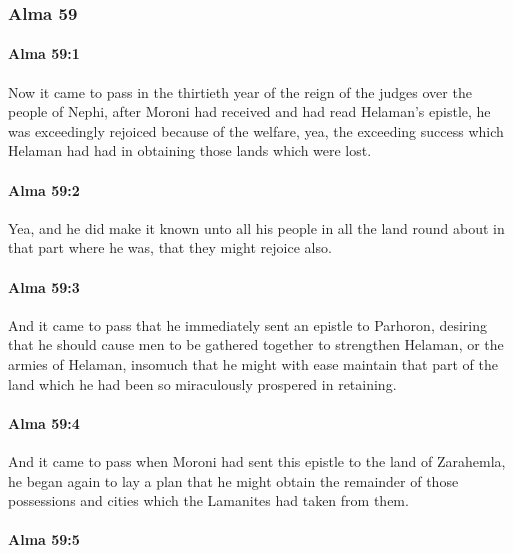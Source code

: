 	\subsubsection{Alma 59} %
		\label{ALMA-59}
		
		\paragraph{Alma 59:1} %
			\label{ALMA-59-1}

			Now it came to pass in the thirtieth year
			of the reign of the judges over the people of Nephi,
			after Moroni had received and had read Helaman's epistle,
			he was exceedingly rejoiced because of the welfare,
			yea, the exceeding success which Helaman had had
			in obtaining those lands which were lost.

		\paragraph{Alma 59:2} %
			\label{ALMA-59-2}

			Yea, and he did make it known unto all his people
			in all the land round about in that part where he was,
			that they might rejoice also.

		\paragraph{Alma 59:3} %
			\label{ALMA-59-3}

			And it came to pass that he immediately sent an epistle to Parhoron,
			desiring that he should cause men to be gathered together
			to strengthen Helaman, or the armies of Helaman,
			insomuch that he might with ease maintain that part of the land
			which he had been so miraculously prospered in retaining.

		\paragraph{Alma 59:4} %
			\label{ALMA-59-4}

			And it came to pass
			when Moroni had sent this epistle to the land of Zarahemla,
			he began again to lay a plan
			that he might obtain the remainder of those possessions and cities
			which the Lamanites had taken from them.

		\paragraph{Alma 59:5} %
			\label{ALMA-59-5}

